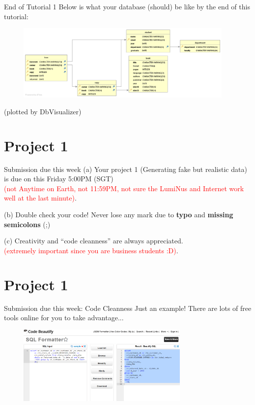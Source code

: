 \begin{frame}[fragile]{End of Tutorial 1}
	Below is what your database (should) be like by the end of this tutorial:
	
	\begin{figure}
		\includegraphics[width=0.95\textwidth]{t1/images/t1-end.png}
	\end{figure}
 (plotted by DbVisualizer)
\end{frame}

\section*{Project 1}

\begin{frame}[fragile]{Submission due this week}
	(a) Your project 1 (Generating fake but realistic data) is due on this Friday 5:00PM (SGT)
	\\ \textcolor{red}{\scriptsize(not Anytime on Earth, not 11:59PM, not sure the LumiNus and Internet work well at the last minute)}.\vspace{10pt}
	
	(b) Double check your code! Never lose any mark due to \textbf{typo} and \textbf{missing semicolons} (;) \vspace{10pt}
	
	(c) Creativity and ``code cleanness'' are always appreciated.
	\\ \textcolor{red}{\scriptsize(extremely important since you are business students :D)}.\vspace{10pt}
\end{frame}
\section*{Project 1}

\begin{frame}[fragile]{Submission due this week: Code Cleanness}
	Just an example! There are lots of free tools online for you to take advantage... \vspace{10pt}
	\begin{figure}
		\includegraphics[width=0.75\textwidth]{t1/images/code_format.png}
	\end{figure}
\end{frame}

